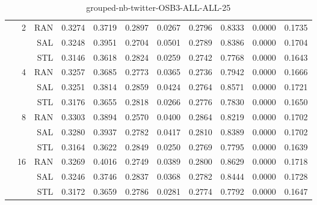 \begin{center}
\begin{table}[htbp]
\begin{tabular}{ | r | r | r | r | r | r | r | r | r | r | r |}
 & \multirow{3}{*}{2} & RAN & 0.3274 & 0.3719 & 0.2897 & 0.0267 & 0.2796 & 0.8333 & 0.0000 & 0.1735\\ \cline{3-11}
 &   & SAL & 0.3248 & 0.3951 & 0.2704 & 0.0501 & 0.2789 & 0.8386 & 0.0000 & 0.1704\\ \cline{3-11}
 &   & STL & 0.3146 & 0.3618 & 0.2824 & 0.0259 & 0.2742 & 0.7768 & 0.0000 & 0.1643\\ \cline{2-11}
 & \multirow{3}{*}{4} & RAN & 0.3257 & 0.3685 & 0.2773 & 0.0365 & 0.2736 & 0.7942 & 0.0000 & 0.1666\\ \cline{3-11}
 &   & SAL & 0.3251 & 0.3814 & 0.2859 & 0.0424 & 0.2764 & 0.8571 & 0.0000 & 0.1721\\ \cline{3-11}
 &   & STL & 0.3176 & 0.3655 & 0.2818 & 0.0266 & 0.2776 & 0.7830 & 0.0000 & 0.1650\\ \cline{2-11}
 & \multirow{3}{*}{8} & RAN & 0.3303 & 0.3894 & 0.2570 & 0.0400 & 0.2864 & 0.8219 & 0.0000 & 0.1702\\ \cline{3-11}
 &   & SAL & 0.3280 & 0.3937 & 0.2782 & 0.0417 & 0.2810 & 0.8389 & 0.0000 & 0.1702\\ \cline{3-11}
 &   & STL & 0.3164 & 0.3622 & 0.2849 & 0.0250 & 0.2769 & 0.7795 & 0.0000 & 0.1639\\ \cline{2-11}
 & \multirow{3}{*}{16} & RAN & 0.3269 & 0.4016 & 0.2749 & 0.0389 & 0.2800 & 0.8629 & 0.0000 & 0.1718\\ \cline{3-11}
 &   & SAL & 0.3246 & 0.3746 & 0.2837 & 0.0368 & 0.2782 & 0.8444 & 0.0000 & 0.1728\\ \cline{3-11}
 &   & STL & 0.3172 & 0.3659 & 0.2786 & 0.0281 & 0.2774 & 0.7792 & 0.0000 & 0.1647\\ \cline{2-11}
\hline
\end{tabular}
\caption{grouped-nb-twitter-OSB3-ALL-ALL-25}
\end{table}
\end{center}

